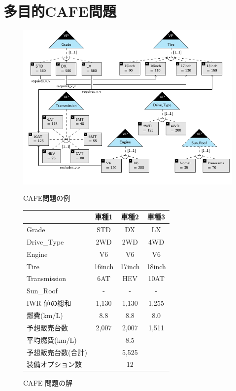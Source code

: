 \section{多目的CAFE問題}\label{sec:background}

\begin{figure}[t]\centering
  \begin{minipage}[b]{0.5\linewidth}
    \includegraphics[width=1.0\linewidth]{images/ovm_example.pdf}
    \caption{CAFE問題の例}\label{fig:ovm}
  \end{minipage}\hfill
  \begin{minipage}[b]{0.4\linewidth}
    \begin{tabular}{l|c|c|c}\hline\hline
      & 車種1  & 車種2  & 車種3\\\hline
      \textsf{Grade}        & \textsf{STD}    & \textsf{DX}     & \textsf{LX}\\
      \textsf{Drive\_Type}  & \textsf{2WD}    & \textsf{2WD}    & \textsf{4WD}\\
      \textsf{Engine}	    & \textsf{V6}     & \textsf{V6}     & \textsf{V6}\\
      \textsf{Tire}	    & \textsf{16inch} & \textsf{17inch} & \textsf{18inch}\\
      \textsf{Transmission} & \textsf{6AT}    & \textsf{HEV}    & \textsf{10AT}\\
      \textsf{Sun\_Roof}    & -               & -               & -  \\\hline\hline
      IWR 値の総和           & 1,130  & 1,130   & 1,255 \\ %
      燃費(km/L)      & 8.8  & 8.8     & 8.0 \\ %
      予想販売台数    & 2,007   & 2,007   & 1,511  \\ \hline
      平均燃費(km/L)  & \multicolumn{3}{c}{8.5} \\ 
      予想販売台数(合計)  & \multicolumn{3}{c}{5,525} \\ 
      装備オプション数 & \multicolumn{3}{c}{12}	\\ \hline
    \end{tabular}
    \caption{CAFE 問題の解}\label{fig:ovm:ans}
\end{minipage}
\end{figure}
